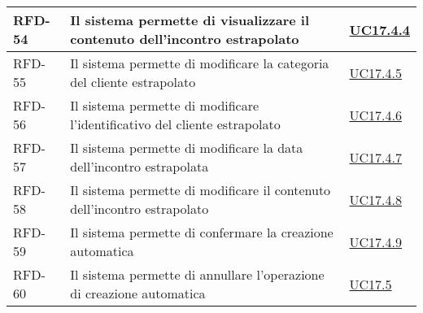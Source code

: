 \begin{table}
\begin{tabularx}{\textwidth}{lXl}
    \hline
    RFD-54 \label{RFN-54} & Il sistema permette di visualizzare il contenuto dell'incontro estrapolato & \hyperref[UC17.4.4]{UC17.4.4} \\
    \hline
    RFD-55 \label{RFN-55} & Il sistema permette di modificare la categoria del cliente estrapolato & \hyperref[UC17.4.5]{UC17.4.5} \\
    \hline
    RFD-56 \label{RFN-56} & Il sistema permette di modificare l'identificativo del cliente estrapolato & \hyperref[UC17.4.6]{UC17.4.6} \\
    \hline
    RFD-57 \label{RFN-57} & Il sistema permette di modificare la data dell'incontro estrapolata & \hyperref[UC17.4.7]{UC17.4.7} \\
    \hline
    RFD-58 \label{RFN-58} & Il sistema permette di modificare il contenuto dell'incontro estrapolato & \hyperref[UC17.4.8]{UC17.4.8} \\
    \hline
    RFD-59 \label{RFN-59} & Il sistema permette di confermare la creazione automatica & \hyperref[UC17.4.9]{UC17.4.9} \\
    \hline
    RFD-60 \label{RFN-60} & Il sistema permette di annullare l'operazione di creazione automatica & \hyperref[UC17.5]{UC17.5} \\
    \hline
\end{tabularx}
\end{table}

\clearpage

